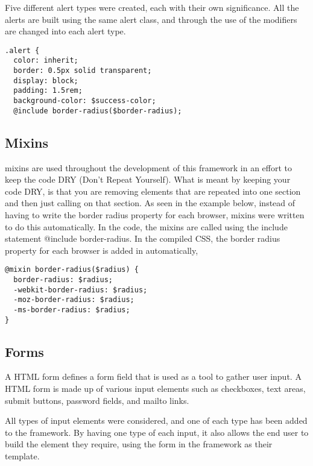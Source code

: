 Five different alert types were created, each with their own significance. All the alerts are built using the same alert class, and through the use of the modifiers are changed into each alert type. 

\begin{lstlisting}[language=CSS3]
.alert {
  color: inherit;
  border: 0.5px solid transparent;
  display: block;
  padding: 1.5rem;
  background-color: $success-color;
  @include border-radius($border-radius);
\end{lstlisting}

\subsection*{Mixins}
\gls{mixins} are used throughout the development of this framework in an effort to keep the code \gls{DRY} (Don't Repeat Yourself). What is meant by keeping your code DRY, is that you are removing elements that are repeated into one section and then just calling on that section. As seen in the example below, instead of having to write the border radius property for each browser, \gls{mixins} were written to do this automatically. In the code, the \gls{mixins} are called using the include statement @include border-radius. In the compiled \gls{CSS}, the border radius property for each browser is added in automatically, 

\begin{lstlisting}[language=CSS3]
@mixin border-radius($radius) {
  border-radius: $radius;
  -webkit-border-radius: $radius;
  -moz-border-radius: $radius;
  -ms-border-radius: $radius;
}
\end{lstlisting}


\newpage
\subsection*{Forms}
A \gls{HTML} form defines a form field that is used as a tool to gather user input. A \gls{HTML} form is made up of various input elements such as checkboxes, text areas, submit buttons, password fields, and mailto links. 

All types of input elements were considered, and one of each type has been added to the framework. By having one type of each input, it also allows the end user to build the element they require, using the form in the framework as their template. 

